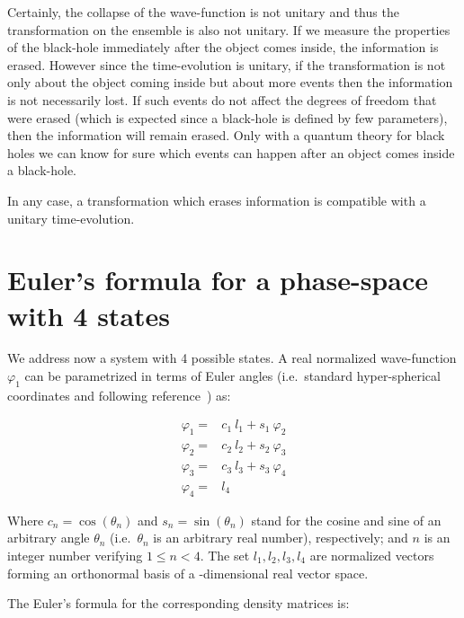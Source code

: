 \documentclass[11pt]{book}
\begin{document}
Certainly, the collapse of the wave-function is not unitary and thus the
transformation on the ensemble is also not unitary. If we measure the
properties of the black-hole immediately after the object comes inside,
the information is erased. However since the time-evolution is unitary,
if the transformation is not only about the object coming inside but
about more events then the information is not necessarily lost. If such
events do not affect the degrees of freedom that were erased (which is
expected since a black-hole is defined by few parameters), then the
information will remain erased. Only with a quantum theory for black
holes we can know for sure which events can happen after an object comes
inside a black-hole.

In any case, a transformation which erases information is compatible
with a unitary time-evolution.

\hypertarget{eulers-formula-for-a-phase-space-with-4-states}{%
\section{Euler's formula for a phase-space with 4
states}\label{eulers-formula-for-a-phase-space-with-4-states}}

We address now a system with 4 possible states. A real normalized
wave-function \(\varphi_1\) can be parametrized in terms of Euler angles
(i.e.~standard hyper-spherical coordinates and following
reference~\cite{Hoffman1972Generalization}) as:

\begin{equation}\begin{aligned}
    \varphi_{1}=&c_{1}\ l_{1}+s_{1}\ \varphi_{2}\\
    \varphi_{2}=&c_{2}\ l_{2}+s_{2}\ \varphi_{3}\\
    \varphi_{3}=&c_{3}\ l_{3}+s_{3}\ \varphi_{4}\\   
    \varphi_{4}=&l_{4}
\end{aligned}\end{equation}

Where \(c_n=\cos(\theta_n)\) and \(s_n=\sin(\theta_n)\) stand for the
cosine and sine of an arbitrary angle \(\theta_n\) (i.e.~\(\theta_n\) is
an arbitrary real number), respectively; and \(n\) is an integer number
verifying \(1\leq n<4\). The set \(l_{1}, l_{2}, l_{3}, l_{4}\) are
normalized vectors forming an orthonormal basis of a -dimensional real
vector space.

The Euler's formula for the corresponding density matrices is:
\end{document}
